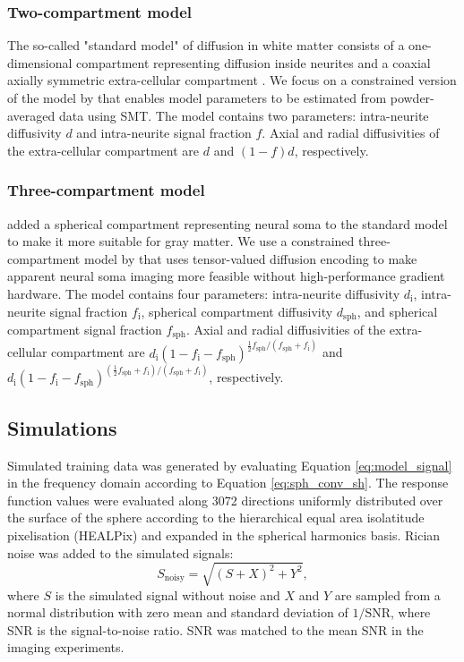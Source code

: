 \documentclass[10pt, letterpaper, oneside]{article}
\begin{document}
\subsubsection{Two-compartment model}

The so-called "standard model" of diffusion in white matter consists of a one-dimensional compartment representing diffusion inside neurites and a coaxial axially symmetric extra-cellular compartment \citep{novikov2019quantifying}. We focus on a constrained version of the model by \cite{kaden2016multi} that enables model parameters to be estimated from powder-averaged data using SMT. The model contains two parameters: intra-neurite diffusivity $d$ and intra-neurite signal fraction $f$. Axial and radial diffusivities of the extra-cellular compartment are $d$ and $(1 - f)d$, respectively.

\subsubsection{Three-compartment model}
 
\cite{palombo2020sandi} added a spherical compartment representing neural soma to the standard model to make it more suitable for gray matter. We use a constrained three-compartment model by \cite{gyori2021potential} that uses tensor-valued diffusion encoding to make apparent neural soma imaging more feasible without high-performance gradient hardware. The model contains four parameters: intra-neurite diffusivity $d_\text{i}$, intra-neurite signal fraction $f_\text{i}$, spherical compartment diffusivity $d_\text{sph}$, and spherical compartment signal fraction $f_\text{sph}$. Axial and radial diffusivities of the extra-cellular compartment are $d_\text{i} (1 - f_\text{i} - f_\text{sph})^{\frac{1}{2} f_\text{sph} / (f_\text{sph} + f_\text{i})}$ and $d_\text{i} (1 - f_\text{i} - f_\text{sph})^{(\frac{1}{2} f_\text{sph} + f_\text{i}) / (f_\text{sph} + f_\text{i})}$, respectively.


\subsection{Simulations}

Simulated training data was generated by evaluating Equation \ref{eq:model_signal} in the frequency domain according to Equation \ref{eq:sph_conv_sh}. The response function values were evaluated along 3072 directions uniformly distributed over the surface of the sphere according to the hierarchical equal area isolatitude pixelisation (HEALPix) \citep{gorski2005healpix, zonca2019healpy} and expanded in the spherical harmonics basis. Rician noise was added to the simulated signals:
\begin{equation}
S_{\text{noisy}} = \sqrt{ \left( S + X \right)^2 + Y^2} ,
\end{equation}
where $S$ is the simulated signal without noise and $X$ and $Y$ are sampled from a normal distribution with zero mean and standard deviation of $1/\text{SNR}$, where SNR is the signal-to-noise ratio. SNR was matched to the mean SNR in the imaging experiments.
\end{document}
